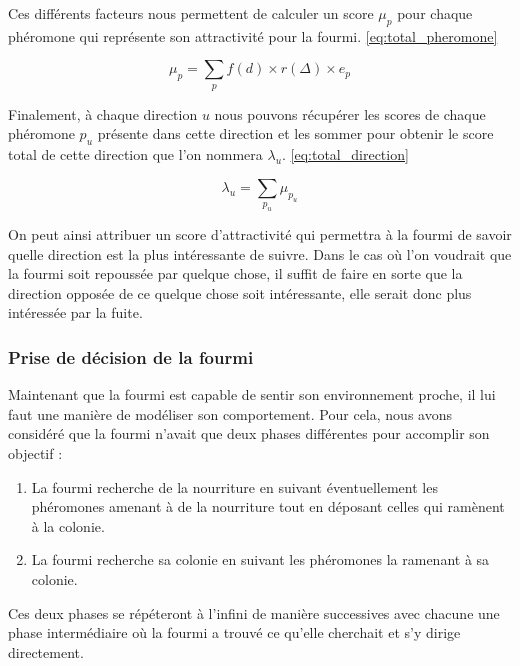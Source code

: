 \documentclass{EPUProjetDi}
\begin{document}
Ces différents facteurs nous permettent de calculer un score $\mu_{p}$ pour chaque phéromone qui représente 
son attractivité pour la fourmi. \eqref{eq:total_pheromone}

\begin{equation}
    \mu_{p} = \sum_{p}{} f(d) \times r(\Delta) \times e_{p}
    \label{eq:total_pheromone}
\end{equation}

Finalement, à chaque direction $u$ nous pouvons récupérer les scores de chaque phéromone $p_{u}$ présente dans cette direction
et les sommer pour obtenir le score total de cette direction que l'on nommera $\lambda_{u}$. \eqref{eq:total_direction}

\begin{equation}
    \lambda_{u} = \sum_{p_{u}}{} \mu_{p_{u}}
    \label{eq:total_direction}
\end{equation}

On peut ainsi attribuer un score d'attractivité qui permettra à la fourmi de savoir quelle direction est la plus intéressante de suivre.
Dans le cas où l'on voudrait que la fourmi soit repoussée par quelque chose, il suffit de faire en sorte que la direction opposée de ce quelque chose
soit intéressante, elle serait donc plus intéressée par la fuite. 

\subsubsection{Prise de décision de la fourmi}

Maintenant que la fourmi est capable de sentir son environnement proche, il lui faut une manière de modéliser son comportement.
Pour cela, nous avons considéré que la fourmi n'avait que deux phases différentes pour accomplir son objectif :
\begin{enumerate}
    \item La fourmi recherche de la nourriture en suivant éventuellement les phéromones amenant à de la nourriture tout en déposant celles qui ramènent à la colonie.
    \item La fourmi recherche sa colonie en suivant les phéromones la ramenant à sa colonie.
\end{enumerate}

Ces deux phases se répéteront à l'infini de manière successives avec chacune une phase intermédiaire où la fourmi a trouvé ce qu'elle cherchait
et s'y dirige directement. 

\pagebreak
\end{document}
